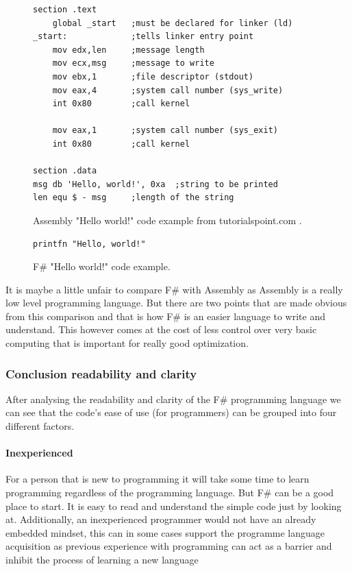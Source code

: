 \documentclass[12pt, a4paper]{article}
\begin{document}
\begin{figure}[!h]
	\begin{lstlisting}
section	.text
    global _start   ;must be declared for linker (ld)
_start:	            ;tells linker entry point
    mov	edx,len     ;message length
    mov	ecx,msg     ;message to write
    mov	ebx,1       ;file descriptor (stdout)
    mov	eax,4       ;system call number (sys_write)
    int	0x80        ;call kernel
	
    mov	eax,1       ;system call number (sys_exit)
    int	0x80        ;call kernel

section	.data
msg db 'Hello, world!', 0xa  ;string to be printed
len equ $ - msg     ;length of the string
	\end{lstlisting}
	\caption{Assembly "Hello world!" code example from tutorialspoint.com \cite{tutorialspoint}.}
	\label{fig:assemblyExample}
\end{figure}

\begin{figure}[!h]
	\begin{lstlisting}
printfn "Hello, world!"
	\end{lstlisting}
	\caption{F\# "Hello world!" code example.}
	\label{fig:fSharpHelloWorld}
\end{figure}

It is maybe a little unfair to compare F\# with Assembly as Assembly is a really low level programming language. But there are two points that are made obvious from this comparison and that is how F\# is an easier language to write and understand. This however comes at the cost of less control over very basic computing that is important for really good optimization.

\newpage


\subsubsection{Conclusion readability and clarity}

After analysing the readability and clarity of the F\# programming language we can see that the code's ease of use (for programmers) can be grouped into four different factors.

\paragraph{Inexperienced}
For a person that is new to programming it will take some time to learn programming regardless of the programming language. But F\# can be a good place to start. It is easy to read and understand the simple code just by looking at. Additionally, an inexperienced programmer would not have an already embedded mindset, this can in some cases support the programme language acquisition as previous experience with programming can act as a barrier and inhibit the process of learning a new language
\end{document}
